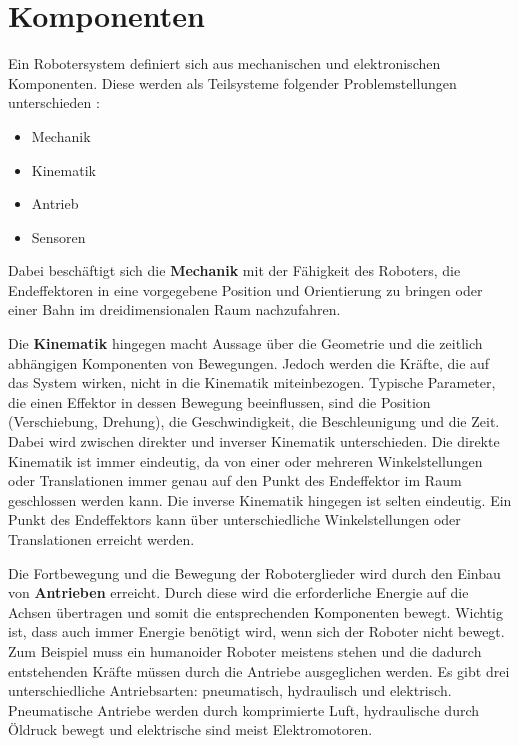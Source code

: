 \section{Komponenten}\label{Komponenten}
Ein Robotersystem definiert sich aus mechanischen und elektronischen Komponenten. Diese werden als Teilsysteme folgender Problemstellungen unterschieden \cite{Haun2007}:
\begin{itemize}
\item Mechanik
\item Kinematik
\item Antrieb
\item Sensoren
\end{itemize}
Dabei beschäftigt sich die \textbf{Mechanik} mit der Fähigkeit des Roboters, die Endeffektoren in eine vorgegebene Position und Orientierung zu bringen oder einer Bahn im dreidimensionalen Raum nachzufahren.

Die \textbf{Kinematik} hingegen macht Aussage über die Geometrie und die zeitlich abhängigen Komponenten von Bewegungen. Jedoch werden die Kräfte, die auf das System wirken, nicht in die Kinematik miteinbezogen. Typische Parameter, die einen Effektor in dessen Bewegung beeinflussen, sind die Position (Verschiebung, Drehung), die Geschwindigkeit, die Beschleunigung und die Zeit. Dabei wird zwischen direkter und inverser Kinematik unterschieden. Die direkte Kinematik ist immer eindeutig, da von einer oder mehreren Winkelstellungen oder Translationen immer genau auf den Punkt des Endeffektor im Raum geschlossen werden kann. Die inverse Kinematik hingegen ist selten eindeutig. Ein Punkt des Endeffektors kann über unterschiedliche Winkelstellungen oder Translationen erreicht werden. 

Die Fortbewegung und die Bewegung der Roboterglieder wird durch den Einbau von \textbf{Antrieben} erreicht. Durch diese wird die erforderliche Energie auf die Achsen übertragen und somit die entsprechenden Komponenten bewegt. Wichtig ist, dass auch immer Energie benötigt wird, wenn sich der Roboter nicht bewegt. Zum Beispiel muss ein humanoider Roboter meistens stehen und die dadurch entstehenden Kräfte müssen durch die Antriebe ausgeglichen werden. Es gibt drei unterschiedliche Antriebsarten: pneumatisch, hydraulisch und elektrisch. Pneumatische Antriebe werden durch komprimierte Luft, hydraulische durch Öldruck bewegt und elektrische sind meist Elektromotoren. 

